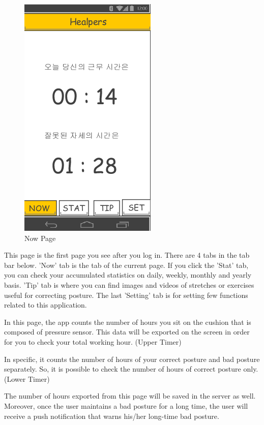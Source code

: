 \documentclass[conference]{IEEEtran}
\begin{document}
\begin{figure}[h]
\begin{center}
    \includegraphics[scale=1]{img_12}
    \caption{Now Page} 
\end{center}
\end{figure}

 This page is the first page you see after you log in. There are 4 tabs in the tab bar below. 'Now' tab is the tab of the current page. If you click the 'Stat' tab, you can check your accumulated statistics on daily, weekly, monthly  and yearly basis. 'Tip' tab is where you can find images and videos of stretches or exercises useful for correcting posture. The last 'Setting' tab is for setting few functions related to this application.

 In this page, the app counts the number of hours you sit on the cushion that is composed of pressure sensor. This data will be exported on the screen in order for you to check your total working hour. (Upper Timer)
 
In specific, it counts the number of hours of your correct posture and bad posture separately. So, it is possible to check the number of hours of correct posture only. (Lower Timer)

 The number of hours exported from this page will be saved in the server as well. Moreover, once the user maintains a bad posture for a long time, the user will receive a push notification that warns his/her long-time bad  posture.\\
\end{document}
